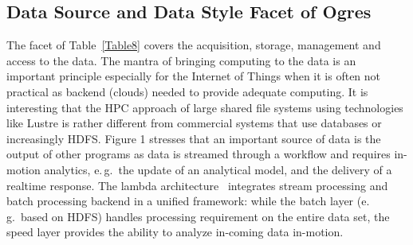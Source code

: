 \documentclass{acm_proc_article-sp}
\begin{document}
\subsection{Data Source and Data Style Facet of Ogres}

The facet of Table~\ref{Table8} covers the acquisition, storage, management and
access to the data. The mantra of bringing computing to the data is an
important principle especially for the Internet of Things when it is often not
practical as backend (clouds) needed to provide adequate computing. It is
interesting that the HPC approach of large shared file systems using
technologies like Lustre is rather different from commercial systems that use
databases or increasingly HDFS. Figure 1 stresses that an important source of
data is the output of other programs as data is streamed through a workflow and
requires in-motion analytics, e.\,g.\ the update of an analytical model, and
the delivery of a realtime response. The lambda
architecture~\cite{marz2013principles} integrates stream processing and batch
processing backend in a unified framework: while the batch layer (e.\,g.\ based
on HDFS) handles processing requirement on the entire data set, the speed layer
provides the ability to analyze in-coming data in-motion.
\end{document}
